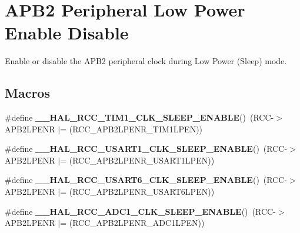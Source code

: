 \hypertarget{group___r_c_c___a_p_b2___low_power___enable___disable}{}\section{A\+P\+B2 Peripheral Low Power Enable Disable}
\label{group___r_c_c___a_p_b2___low_power___enable___disable}


Enable or disable the A\+P\+B2 peripheral clock during Low Power (Sleep) mode.  


\subsection*{Macros}
\begin{DoxyCompactItemize}
\item 
\#define {\bfseries \+\_\+\+\_\+\+H\+A\+L\+\_\+\+R\+C\+C\+\_\+\+T\+I\+M1\+\_\+\+C\+L\+K\+\_\+\+S\+L\+E\+E\+P\+\_\+\+E\+N\+A\+B\+LE}()~(R\+CC-\/$>$A\+P\+B2\+L\+P\+E\+NR $\vert$= (R\+C\+C\+\_\+\+A\+P\+B2\+L\+P\+E\+N\+R\+\_\+\+T\+I\+M1\+L\+P\+EN))\hypertarget{group___r_c_c___a_p_b2___low_power___enable___disable_ga6ce02f1b2689c664010bebc2363d1db4}{}\label{group___r_c_c___a_p_b2___low_power___enable___disable_ga6ce02f1b2689c664010bebc2363d1db4}

\item 
\#define {\bfseries \+\_\+\+\_\+\+H\+A\+L\+\_\+\+R\+C\+C\+\_\+\+U\+S\+A\+R\+T1\+\_\+\+C\+L\+K\+\_\+\+S\+L\+E\+E\+P\+\_\+\+E\+N\+A\+B\+LE}()~(R\+CC-\/$>$A\+P\+B2\+L\+P\+E\+NR $\vert$= (R\+C\+C\+\_\+\+A\+P\+B2\+L\+P\+E\+N\+R\+\_\+\+U\+S\+A\+R\+T1\+L\+P\+EN))\hypertarget{group___r_c_c___a_p_b2___low_power___enable___disable_ga454514918be60a95069da332eb212712}{}\label{group___r_c_c___a_p_b2___low_power___enable___disable_ga454514918be60a95069da332eb212712}

\item 
\#define {\bfseries \+\_\+\+\_\+\+H\+A\+L\+\_\+\+R\+C\+C\+\_\+\+U\+S\+A\+R\+T6\+\_\+\+C\+L\+K\+\_\+\+S\+L\+E\+E\+P\+\_\+\+E\+N\+A\+B\+LE}()~(R\+CC-\/$>$A\+P\+B2\+L\+P\+E\+NR $\vert$= (R\+C\+C\+\_\+\+A\+P\+B2\+L\+P\+E\+N\+R\+\_\+\+U\+S\+A\+R\+T6\+L\+P\+EN))\hypertarget{group___r_c_c___a_p_b2___low_power___enable___disable_ga47fc15bdbf943a0b7164d888f1811184}{}\label{group___r_c_c___a_p_b2___low_power___enable___disable_ga47fc15bdbf943a0b7164d888f1811184}

\item 
\#define {\bfseries \+\_\+\+\_\+\+H\+A\+L\+\_\+\+R\+C\+C\+\_\+\+A\+D\+C1\+\_\+\+C\+L\+K\+\_\+\+S\+L\+E\+E\+P\+\_\+\+E\+N\+A\+B\+LE}()~(R\+CC-\/$>$A\+P\+B2\+L\+P\+E\+NR $\vert$= (R\+C\+C\+\_\+\+A\+P\+B2\+L\+P\+E\+N\+R\+\_\+\+A\+D\+C1\+L\+P\+EN))\hypertarget{group___r_c_c___a_p_b2___low_power___enable___disable_ga37931819af9a7b1a05385e0ae6c984b6}{}\label{group___r_c_c___a_p_b2___low_power___enable___disable_ga37931819af9a7b1a05385e0ae6c984b6}


\end{DoxyCompactItemize}
